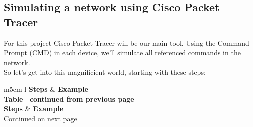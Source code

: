\documentclass[11pt,a4paper]{report}
\begin{document}
    \subsection{Simulating a network using Cisco Packet Tracer}
        For this project Cisco Packet Tracer will be our main tool. Using the Command Prompt (CMD) in each device, we'll simulate all referenced commands in the network.\\
        So let's get into this magnificient world, starting with these steps:\\
        \begin{flushleft}
            \begin{center}
                \begin{longtable}{ m{5cm} l }
                    \textbf{Steps} & \textbf{Example} \\
                    \hline
                    \endfirsthead
                    {{\bfseries Table \thetable\ continued from previous page}} \\
                    \textbf{Steps} & \textbf{Example} \\
                    \hline
                    \endhead
                    \hline Continued on next page \\
                    \endfoot
                    \endlastfoot


\end{longtable}
\end{center}
\end{flushleft}
\end{document}
